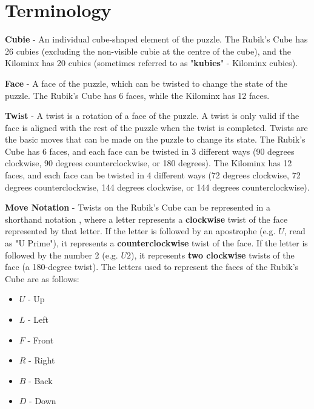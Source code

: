 \section{Terminology}
\textbf{Cubie} - An individual cube-shaped element of the puzzle. The Rubik's Cube has 26 cubies (excluding the non-visible cubie at the centre of the cube), and the Kilominx has 20 cubies (sometimes referred to as "\textbf{kubies}" - Kilominx cubies).

\textbf{Face} - A face of the puzzle, which can be twisted to change the state of the puzzle. The Rubik's Cube has 6 faces, while the Kilominx has 12 faces.

\textbf{Twist} - A twist is a rotation of a face of the puzzle. A twist is only valid if the face is aligned with the rest of the puzzle when the twist is completed. Twists are the basic moves that can be made on the puzzle to change its state. The Rubik's Cube has 6 faces, and each face can be twisted in 3 different ways (90 degrees clockwise, 90 degrees counterclockwise, or 180 degrees). The Kilominx has 12 faces, and each face can be twisted in 4 different ways (72 degrees clockwise, 72 degrees counterclockwise, 144 degrees clockwise, or 144 degrees counterclockwise).

\textbf{Move Notation} - Twists on the Rubik's Cube can be represented in a shorthand notation \cite{rubiksnotation}, where a letter represents a \textbf{clockwise} twist of the face represented by that letter. If the letter is followed by an apostrophe (e.g. $U$, read as "U Prime"), it represents a \textbf{counterclockwise} twist of the face. If the letter is followed by the number 2 (e.g. $U2$), it represents \textbf{two clockwise} twists of the face (a 180-degree twist). The letters used to represent the faces of the Rubik's Cube are as follows:
\begin{itemize}
    \item $U$ - Up
    \item $L$ - Left
    \item $F$ - Front
    \item $R$ - Right
    \item $B$ - Back
    \item $D$ - Down
\end{itemize}

